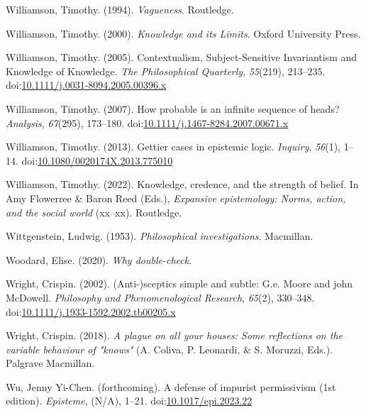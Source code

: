 \documentclass[
  12pt,
  letterpaper,
]{scrbook}
\newlength{\cslhangindent}
\newenvironment{CSLReferences}[2] %
 {\begin{list}{}{%
  \setlength{\itemindent}{0pt}
  \setlength{\leftmargin}{0pt}
  \setlength{\parsep}{0pt}
  \ifodd #1
   \setlength{\leftmargin}{\cslhangindent}
   \setlength{\itemindent}{-1\cslhangindent}
  \fi
  \setlength{\itemsep}{#2\baselineskip}}}
 {\end{list}}
\begin{document}
\begin{CSLReferences}{1}{0}
Williamson, Timothy. (1994). \emph{{Vagueness}}. Routledge.

Williamson, Timothy. (2000). \emph{{Knowledge and its Limits}}. Oxford
University Press.

Williamson, Timothy. (2005). {Contextualism, Subject-Sensitive
Invariantism and Knowledge of Knowledge}. \emph{The Philosophical
Quarterly}, \emph{55}(219), 213--235.
doi:\href{https://doi.org/10.1111/j.0031-8094.2005.00396.x}{10.1111/j.0031-8094.2005.00396.x}

Williamson, Timothy. (2007). How probable is an infinite sequence of
heads? \emph{Analysis}, \emph{67}(295), 173--180.
doi:\href{https://doi.org/10.1111/j.1467-8284.2007.00671.x}{10.1111/j.1467-8284.2007.00671.x}

Williamson, Timothy. (2013). Gettier cases in epistemic logic.
\emph{Inquiry}, \emph{56}(1), 1--14.
doi:\href{https://doi.org/10.1080/0020174X.2013.775010}{10.1080/0020174X.2013.775010}

Williamson, Timothy. (2022). Knowledge, credence, and the strength of
belief. In Amy Flowerree \& Baron Reed (Eds.), \emph{Expansive
epistemology: Norms, action, and the social world} (xx--xx). Routledge.

Wittgenstein, Ludwig. (1953). \emph{Philosophical investigations}.
Macmillan.

Woodard, Elise. (2020). \emph{Why double-check}.

Wright, Crispin. (2002). (Anti-)sceptics simple and subtle: G.e. Moore
and john McDowell. \emph{Philosophy and Phenomenological Research},
\emph{65}(2), 330--348.
doi:\href{https://doi.org/10.1111/j.1933-1592.2002.tb00205.x}{10.1111/j.1933-1592.2002.tb00205.x}

Wright, Crispin. (2018). \emph{A plague on all your houses: Some
reflections on the variable behaviour of "knows"} (A. Coliva, P.
Leonardi, \& S. Moruzzi, Eds.). Palgrave Macmillan.

Wu, Jenny Yi-Chen. (forthcoming). A defense of impurist permissivism
(1st edition). \emph{Episteme}, (N/A), 1--21.
doi:\href{https://doi.org/10.1017/epi.2023.22}{10.1017/epi.2023.22}


\end{CSLReferences}
\end{document}
